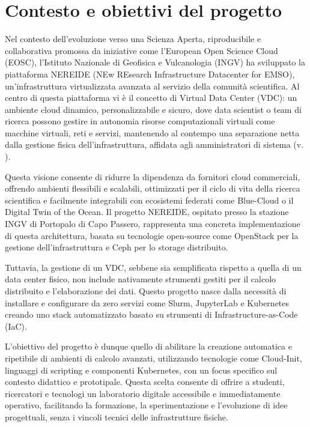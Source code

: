 \documentclass[12pt,a4paper,openright,twoside]{book}
\begin{document}
\section{Contesto e obiettivi del progetto}
Nel contesto dell'evoluzione verso una Scienza Aperta, riproducibile e collaborativa promossa da iniziative come l'European Open Science Cloud (EOSC),
l'Istituto Nazionale di Geofisica e Vulcanologia (INGV) ha sviluppato la piattaforma NEREIDE (NEw REsearch Infrastructure Datacenter for EMSO),
un'infrastruttura virtualizzata avanzata al servizio della comunità scientifica.
Al centro di questa piattaforma vi è il concetto di Virtual Data Center (VDC): 
un ambiente cloud dinamico, personalizzabile e sicuro, dove data scientist o team di ricerca possono gestire in autonomia risorse computazionali virtuali come
macchine virtuali, reti e servizi, mantenendo al contempo una separazione netta dalla gestione fisica dell'infrastruttura, affidata agli amministratori di sistema (v. ).

Questa visione consente di ridurre la dipendenza da fornitori cloud commerciali, offrendo ambienti flessibili e scalabili, ottimizzati per il ciclo di vita della ricerca scientifica
e facilmente integrabili con ecosistemi federati come Blue-Cloud o il Digital Twin of the Ocean.
Il progetto NEREIDE, ospitato presso la stazione INGV di Portopalo di Capo Passero, rappresenta una concreta implementazione di questa architettura,
basata su tecnologie open-source come OpenStack per la gestione dell'infrastruttura e Ceph per lo storage distribuito\cite{cacciaguerra2024vdc}.

Tuttavia, la gestione di un VDC, sebbene sia semplificata rispetto a quella di un data center fisico, non include nativamente strumenti gestiti per il calcolo distribuito
e l'elaborazione dei dati. Questo progetto nasce dalla necessità di installare e configurare da zero servizi come Slurm, JupyterLab e Kubernetes creando uno stack automatizzato
basato su strumenti di Infrastructure-as-Code (IaC).

L'obiettivo del progetto è dunque quello di abilitare la creazione automatica e ripetibile di ambienti di calcolo avanzati, utilizzando tecnologie come Cloud-Init,
linguaggi di scripting e componenti Kubernetes, con un focus specifico sul contesto didattico e prototipale. 
Questa scelta consente di offrire a studenti, ricercatori e tecnologi un laboratorio digitale accessibile e immediatamente operativo, facilitando la formazione,
la sperimentazione e l'evoluzione di idee progettuali, senza i vincoli tecnici delle infrastrutture fisiche.
\end{document}
